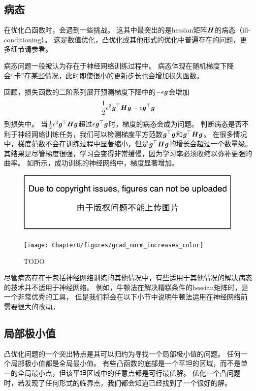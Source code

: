 \subsection{病态}
\label{sec:ill_conditioning}
在优化凸函数时，会遇到一些挑战。
这其中最突出的是\gls{hessian}矩阵$\boldsymbol{\mathit{H}}$的病态（ill-conditioning）。
这是数值优化，凸优化或其他形式的优化中普遍存在的问题，更多细节请参看。

病态问题一般被认为存在于神经网络训练过程中。
病态体现在随机梯度下降会``卡''在某些情况，此时即使很小的更新步长也会增加损失函数。

回顾，损失函数的二阶系列展开预测梯度下降中的$-\epsilon\boldsymbol{\mathit{g}}$会增加
\begin{equation}
    \frac{1}{2} \epsilon^2 \boldsymbol{\mathit{g}}^\top \boldsymbol{\mathit{H}}\boldsymbol{\mathit{g}} - \epsilon\boldsymbol{\mathit{g}}^\top\boldsymbol{\mathit{g}}
\end{equation}
到损失中。
当$\frac{1}{2} \epsilon^2 \boldsymbol{\mathit{g}}^\top\boldsymbol{\mathit{H}}\boldsymbol{\mathit{g}}$超过$\epsilon\boldsymbol{\mathit{g}}^\top\boldsymbol{\mathit{g}}$时，梯度的病态会成为问题。
判断病态是否不利于神经网络训练任务，我们可以检测梯度平方范数$\boldsymbol{\mathit{g}}^\top\boldsymbol{\mathit{g}}$和$\boldsymbol{\mathit{g}}^\top \boldsymbol{\mathit{H}}\boldsymbol{\mathit{g}}$。
在很多情况中，梯度范数不会在训练过程中显著缩小，但是$\boldsymbol{\mathit{g}}^\top\boldsymbol{\mathit{H}}\boldsymbol{\mathit{g}}$的增长会超过一个数量级。
其结果是尽管梯度很强，学习会变得非常缓慢，因为学习率必须收缩以弥补更强的曲率。
如所示，成功训练的神经网络中，梯度显著增加。

\begin{figure}[!htb]
\ifOpenSource
\centerline{\includegraphics{figure.pdf}}
\else
\centerline{\texttt{[image: Chapter8/figures/grad\_norm\_increases\_color]}}
\fi
\caption{TODO}
\label{fig:chap8_grad_norm_increases}
\end{figure}



尽管病态存在于包括神经网络训练的其他情况中，有些适用于其他情况的解决病态的技术并不适用于神经网络。
例如，牛顿法在解决糟糕条件的\gls{hessian}矩阵时，是一个非常优秀的工具，
但是我们将会在以下小节中说明牛顿法运用在神经网络前需要很大的改动。

\subsection{局部极小值}
\label{sec:local_minima}
凸优化问题的一个突出特点是其可以归约为寻找一个局部极小值的问题。
任何一个局部极小值都是全局最小值。
有些凸函数的底部是一个平坦的区域，而不是单一的全局最小点，但该平坦区域中的任意点都是可行最优解。
优化一个凸问题时，若发现了任何形式的临界点，我们都会知道已经找到了一个很好的解。

